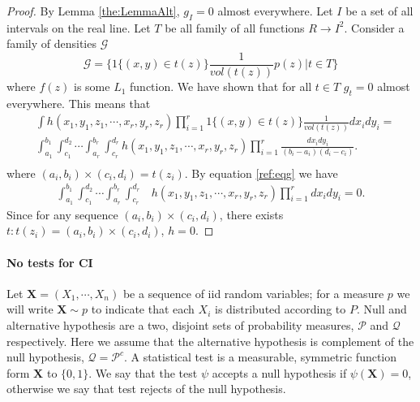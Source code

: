 \documentclass{article}
\begin{document}
\begin{proof}
By Lemma \ref{the:LemmaAlt}, $g_{I}=0$ almost everywhere. 
Let $I$ be a set of all intervals on the real line. Let  $T$ be all family of all functions $R \to I^2$. Consider a family of densities $\mathcal G$
\[
 \mathcal G = \bigg \{ 1\{ (x,y) \in t(z) \}  \frac{1}{vol(t(z))} p(z) | t \in T \bigg \}
\]
where $f(z)$ is some $L_1$ function. We have shown that for all $t \in T$ $g_t=0$ almost everywhere.  This means that 
\begin{align}
&\int h(x_1,y_1,z_1, \cdots, x_r,y_r,z_r) \prod_{i=1}^{r} 1\{ (x,y) \in t(z) \}  \frac{1}{vol(t(z))} dx_i dy_i =\\ 
&\int_{a_1}^{b_1} \int_{c_1}^{d_2} \cdots \int_{a_r}^{b_r} \int_{c_r}^{d_r} h(x_1,y_1,z_1, \cdots, x_r,y_r,z_r) \prod_{i=1}^{r}  \frac{dx_i dy_i}{(b_i - a_i)(d_i-c_i) }. \\   
\end{align}
where $(a_i,b_i) \times (c_i,d_i) = t(z_i)$. 
By equation \ref{ref:eqg} we have 
\begin{align}
 \int_{a_1}^{b_1} \int_{c_1}^{d_2} \cdots \int_{a_r}^{b_r} \int_{c_r}^{d_r}& h(x_1,y_1,z_1, \cdots, x_r,y_r,z_r) \prod_{i=1}^{r}  dx_i dy_i = 0.
\end{align}
Since for any  sequence $ (a_i,b_i)\times (c_i,d_i) $, there exists  $t: t(z_i) = (a_i,b_i)\times (c_i,d_i) $, $h=0$. 
\end{proof}
















\paragraph{No tests for CI}

Let   $\mathbf X = (X_1,\cdots, X_n)$ be a sequence of iid random variables; for a measure $p$ we will write $\mathbf X \sim p$ to indicate that each $X_i$ is distributed according to  $P$.  Null and alternative hypothesis are a two, disjoint sets of probability measures, $\mathcal{P}$ and $\mathcal{Q}$ respectively. Here we assume that the alternative hypothesis is complement of the null hypothesis,  $\mathcal Q = \mathcal{P}^c$.  A statistical test is a measurable, symmetric function form  $\mathbf X$ to $\{0,1\}$. We say that the test $\psi$ accepts a null hypothesis if $\psi(\mathbf X)=0$, otherwise we say that test rejects of the null hypothesis. 
\end{document}
